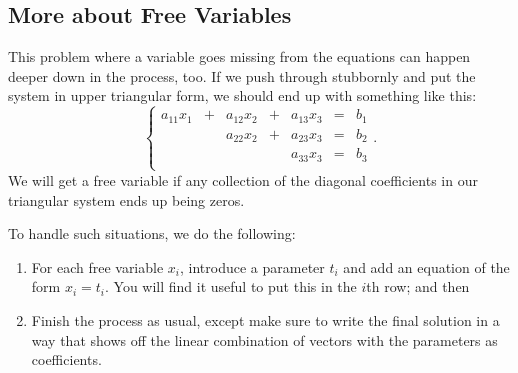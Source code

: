\documentclass[00-livre-main.tex]{subfiles}
\begin{document}
\subsection*{More about Free Variables}

This problem where a variable goes missing from the equations can happen deeper down in the process, too. If we push through stubbornly and put the system in upper triangular form, we should end up with something like this:
\[
\left\{\begin{array}{rrrrrrr}
a_{11}x_1 & + & a_{12} x_2 & + & a_{13}x_3 & = & b_1 \\
& & a_{22} x_2 & + & a_{23}x_3 & = & b_2 \\
&&& & a_{33}x_3 & = & b_3 \\
\end{array}\right. .
\]
We will get a free variable if any collection of the diagonal coefficients in our triangular system ends up being zeros.

To handle such situations, we do the following:
\begin{enumerate}
\item For each free variable $x_i$, introduce a parameter $t_i$ and add an equation of the form $x_i = t_i$. You will find it useful to put this in the $i$th row; and then
\item Finish the process as usual, except make sure to write the final solution in a way that shows off the linear combination of vectors with the parameters as coefficients.
\end{enumerate}
\end{document}
